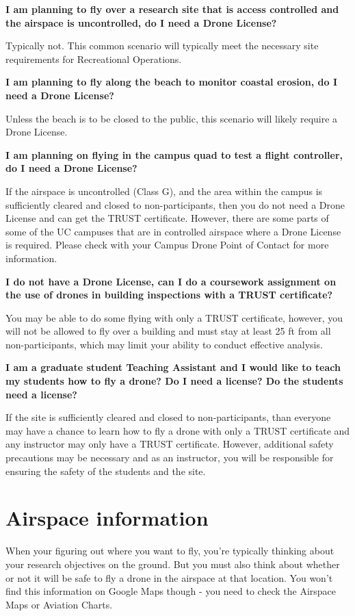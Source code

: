 \documentclass[
  12pt,
]{book}
\begin{document}
\textbf{I am planning to fly over a research site that is access controlled and the airspace is uncontrolled, do I need a Drone License?}

Typically not. This common scenario will typically meet the necessary site requirements for Recreational Operations.

\textbf{I am planning to fly along the beach to monitor coastal erosion, do I need a Drone License?}

Unless the beach is to be closed to the public, this scenario will likely require a Drone License.

\textbf{I am planning on flying in the campus quad to test a flight controller, do I need a Drone License?}

If the airspace is uncontrolled (Class G), and the area within the campus is sufficiently cleared and closed to non-participants, then you do not need a Drone License and can get the TRUST certificate. However, there are some parts of some of the UC campuses that are in controlled airspace where a Drone License is required. Please check with your Campus Drone Point of Contact for more information.

\textbf{I do not have a Drone License, can I do a coursework assignment on the use of drones in building inspections with a TRUST certificate?}

You may be able to do some flying with only a TRUST certificate, however, you will not be allowed to fly over a building and must stay at least 25 ft from all non-participants, which may limit your ability to conduct effective analysis.

\textbf{I am a graduate student Teaching Assistant and I would like to teach my students how to fly a drone? Do I need a license? Do the students need a license?}

If the site is sufficiently cleared and closed to non-participants, than everyone may have a chance to learn how to fly a drone with only a TRUST certificate and any instructor may only have a TRUST certificate. However, additional safety precautions may be necessary and as an instructor, you will be responsible for ensuring the safety of the students and the site.

\hypertarget{airspace-info}{%
\chapter{Airspace information}\label{airspace-info}}

When your figuring out where you want to fly, you're typically thinking about your research objectives on the ground. But you must also think about whether or not it will be safe to fly a drone in the airspace at that location. You won't find this information on Google Maps though - you need to check the Airspace Maps or Aviation Charts.
\end{document}
